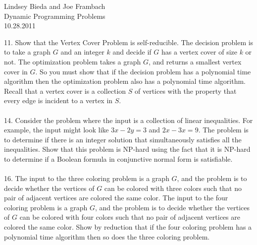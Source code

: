 \documentclass[10pt]{article}
\begin{document}
	\begin{flushright}
	Lindsey Bieda and Joe Frambach\\
	Dynamic Programming Problems\\
	10.28.2011
	\end{flushright}
	11.  Show that the Vertex Cover Problem is self-reducible. The decision problem is to take a graph $G$ and
an integer $k$ and decide if $G$ has a vertex cover of size $k$ or not.  The optimization problem takes a
graph $G$, and returns a smallest vertex cover in $G$.  So you must show that if the decision problem
has a polynomial time algorithm then the optimization problem also has a polynomial time algorithm.
Recall that a vertex cover is a collection $S$ of vertices with the property that every edge is incident to
a vertex in $S$.
    \\
    \\
	14.  Consider the problem where the input is a collection of linear inequalities.  For example, the input
might look like $3x-2y = 3$ and $2x-3x = 9$. The problem is to determine if there is an integer solution
that simultaneously satisfies all the inequalities. Show that this problem is NP-hard using the fact that
it is NP-hard to determine if a Boolean formula in conjunctive normal form is satisfiable.
	\\
	\\
	16.  The input to the three coloring problem is a graph $G$, and the problem is to decide whether the vertices
of $G$ can be colored with three colors such that no pair of adjacent vertices are colored the same color.
The input to the four coloring problem is a graph $G$, and the problem is to decide whether the vertices
of $G$ can be colored with four colors such that no pair of adjacent vertices are colored the same color.
Show by reduction that if the four coloring problem has a polynomial time algorithm then so does the
three coloring problem. 
\end{document}
